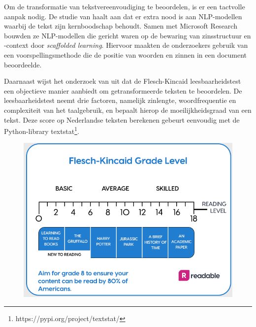 

Om de transformatie van tekstvereenvoudiging te beoordelen, is er een tactvolle aanpak nodig. De studie van \textcite{Swayamdipta2019} haalt aan dat er extra nood is aan NLP-modellen waarbij de tekst zijn kernboodschap behoudt. Samen met Microsoft Research bouwden ze NLP-modellen die gericht waren op de bewaring van zinsstructuur en -context door \emph{scaffolded learning}. Hiervoor maakten de onderzoekers gebruik van een voorspellingsmethode die de positie van woorden en zinnen in een document beoordeelde.

Daarnaast wijst het onderzoek van \textcite{Readable2021} uit dat de Flesch-Kincaid leesbaarheidstest een objectieve manier aanbiedt om getransformeerde teksten te beoordelen. De leesbaarheidstest neemt drie factoren, namelijk zinlengte, woordfrequentie en complexiteit van het taalgebruik, en bepaalt hierop de moeilijkheidsgraad van een tekst. Deze score op Nederlandse teksten berekenen gebeurt eenvoudig met de Python-library textstat\footnote{https://pypi.org/project/textstat/}. 

\begin{figure}
	\includegraphics{img/Screenshot_302.png}
\end{figure}

